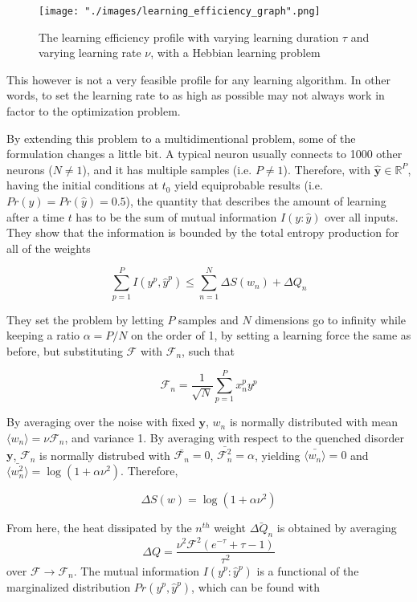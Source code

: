 \begin{figure}[h]
\begin{center}
    \texttt{[image: "./images/learning\_efficiency\_graph".png]}
    \caption{The learning efficiency profile with varying learning duration $\tau$ and varying learning rate $\nu$, with a Hebbian learning problem}
    \label{fig::learning_efficiency}
\end{center}
\end{figure}

This however is not a very feasible profile for any learning algorithm. In other words, to set the learning rate to as high as possible may not always work in factor to the optimization problem.

By extending this problem to a multidimentional problem, some of the formulation changes a little bit. A typical neuron usually connects to 1000 other neurons ($N\neq 1$), and it has multiple samples (i.e. $P\neq 1$). Therefore, with $\hat{\bm{y}} \in \mathbb{R}^{P}$, having the initial conditions at $t_0$ yield equiprobable results (i.e. $Pr(y) = Pr(\hat{y}) = 0.5$), the quantity that describes the amount of learning after a time $t$ has to be the sum of mutual information $I(y:\hat{y})$ over all inputs. They show that the information is bounded by the total entropy production for all of the weights

$$\sum_{p=1}^P I(y^p,\hat{y}^p) \leq \sum_{n=1}^N \Delta S(w_n) + \Delta Q_n $$

They set the problem by letting $P$ samples and $N$ dimensions go to infinity while keeping a ratio $\alpha = P/N$ on the order of 1, by setting a learning force the same as before, but substituting $\mathcal{F}$ with $\mathcal{F}_n$, such that

$$\mathcal{F}_n = \frac{1}{\sqrt{N}} \sum_{p=1}^P x^p_n y^p $$

By averaging over the noise with fixed $\bm{y}$, $w_n$ is normally distributed with mean $\langle w_n \rangle = \nu \mathcal{F}_n$, and variance 1. By averaging with respect to the quenched disorder $\bm{y}$, $\mathcal{F}_n$ is normally distrubed with $\bar{\mathcal{F}_n} = 0$, $\bar{\mathcal{F}_n^2} = \alpha$, yielding $\bar{\langle w_n \rangle} = 0$ and $\bar{\langle w_n^2 \rangle} = \log(1+ \alpha \nu^2)$. Therefore,

$$\Delta S (w) = \log(1+\alpha \nu ^2)$$

From here, the heat dissipated by the $n^{th}$ weight $\bar{\Delta Q_n}$ is obtained by averaging
$$\Delta Q = \frac{\nu^2 \mathcal{F}^2 ( e^{-\tau} + \tau - 1 )}{\tau ^2}$$
 over $\mathcal{F} \rightarrow \mathcal{F}_n$. The mutual information $I(y^p:\hat{y}^p)$ is a functional of the marginalized distribution $Pr(y^p,\hat{y}^p)$, which can be found with

